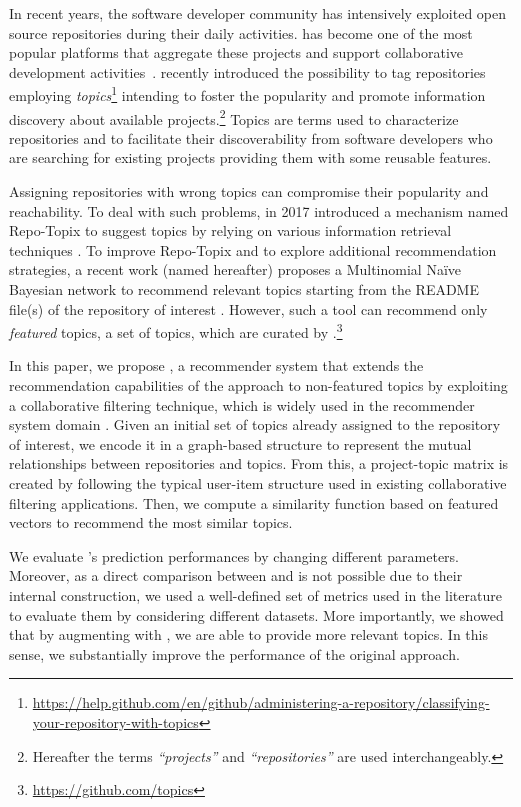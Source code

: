 In recent years, the software developer community has intensively exploited open source 
repositories during their daily activities. \GH has become one of the most
popular platforms that aggregate these projects and support collaborative 
development activities~\cite{7832894}. \GH recently introduced the possibility 
to tag repositories employing 
\emph{topics}\footnote{\url{https://help.github.com/en/github/administering-a-repository/classifying-your-repository-with-topics}}
 intending to foster the popularity and promote information discovery about 
available projects.\footnote{Hereafter the terms \GH  \emph{``projects''} and \emph{``repositories''} 
are used 
interchangeably.} Topics are terms used to characterize repositories and to 
facilitate their discoverability from software developers who are searching 
for existing projects providing them with some reusable features. 

Assigning repositories with wrong topics can compromise their popularity and 
reachability. To deal with such problems, in 2017 \GH introduced a 
mechanism named Repo-Topix to suggest topics by relying on various information 
retrieval techniques \cite{repo-topix}. To improve Repo-Topix 
and to explore additional recommendation strategies, a recent work (named \MNB 
hereafter) proposes a Multinomial Na\"ive Bayesian network to 
recommend relevant topics starting from the README file(s) of the repository of 
interest \cite{10.1145/3383219.3383227}. However, such a tool can recommend 
only \emph{featured} topics, \ie a set of topics, which are curated by 
\GH.\footnote{\url{https://github.com/topics}}


In this paper, we propose \TF, a recommender system that extends the 
recommendation capabilities of the \MNB approach to 
non-featured topics by exploiting a collaborative filtering technique, which is 
widely used in the recommender system domain 
\cite{Schafer:2007:CFR:1768197.1768208}. Given an initial set of topics already 
assigned to the \GH repository of interest, we encode it in a graph-based 
structure to represent the mutual relationships between repositories and 
topics. From this, a project-topic matrix is created by following the 
typical user-item structure used in existing collaborative filtering 
applications. Then, we compute a similarity function based on featured vectors 
to recommend the most similar topics.

We evaluate \TF's prediction performances by changing different parameters. 
Moreover, as a direct comparison between \TF and \MNB is not
possible due to their internal construction, we used a well-defined set of 
metrics used in the literature to evaluate them by 
considering different datasets. More importantly, we showed that by augmenting \MNB with \TF, we are able to provide more relevant topics. %
In this sense, we substantially improve the performance of the original \MNB approach.

